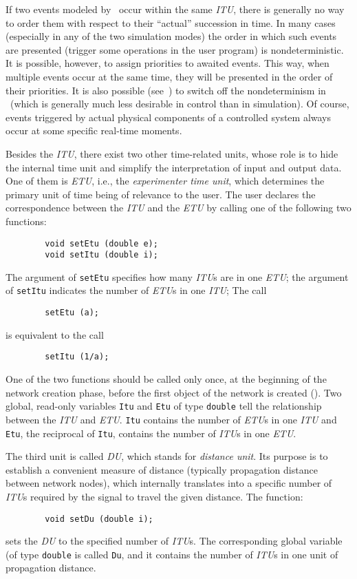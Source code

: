 If two events modeled by \smurph\ occur within the same {\em ITU}, there
is generally
no way to order them with respect to their ``actual'' succession in time.
In many cases (especially in any of the two simulation modes)
the order in which such events are presented (trigger some
operations in the user program) is nondeterministic.
It is possible, however, to assign priorities to awaited events.
This way, when multiple events occur at the same time, they will be
presented in the order of their priorities.
It is also possible (see~) to switch off the nondeterminism
in \smurph\ (which is generally much less desirable in control than in
simulation).
Of course, events triggered by actual physical components of a controlled
system always occur at some specific real-time moments.

Besides the {\em ITU}, there exist two other time-related units, whose role
is to hide the internal time unit and simplify the interpretation of input
and output data.
One of them is {\em ETU}, i.e., the
{\em experimenter time unit}, which determines the primary unit of time being of
relevance to the user.
The user declares the correspondence between the {\em ITU\/} and the {\em ETU\/}
by calling one of the following two functions:
\begin{verbatim}
        void setEtu (double e);
        void setItu (double i);
\end{verbatim}
The argument of {\tt setEtu}
specifies how many {\em ITU\/}s are in one {\em ETU};
the argument of {\tt setItu}
indicates the number of {\em ETU\/}s in one {\em ITU};
The call
\begin{verbatim}
        setEtu (a);
\end{verbatim}
is equivalent to the call
\begin{verbatim}
        setItu (1/a);
\end{verbatim}
One of the two functions
should be called only once, at the beginning of the network
creation phase, before the first object of the network is created
().
Two global, read-only variables {\tt Itu} and {\tt Etu} of type {\tt double}
tell the relationship between the {\em ITU\/} and {\em ETU}.
{\tt Itu} contains the number of {\em ETU\/}s in one {\em ITU\/} and
{\tt Etu}, the reciprocal of {\tt Itu}, contains the number of {\em ITU\/}s
in one {\em ETU}.

The third unit is called {\em DU}, which stands for {\em distance unit}.
Its purpose is to establish a convenient measure of distance (typically
propagation distance between network nodes), which internally translates into
a specific number of {\em ITU\/}s required by the signal to travel the given
distance.
The function:
\begin{verbatim}
        void setDu (double i);
\end{verbatim}
sets the {\em DU\/} to the specified number of {\em ITU\/}s.
The corresponding global variable (of type {\tt double} is called {\tt Du},
and it contains the number of {\em ITU\/}s in one unit of propagation
distance.

